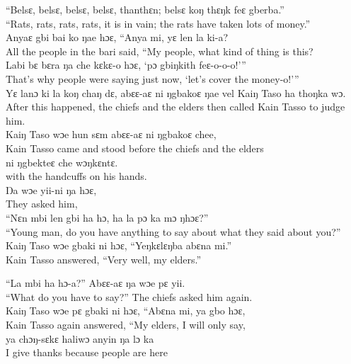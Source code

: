 “Belsɛ, belsɛ, belsɛ, belsɛ, thanthɛn; belsɛ koŋ thɛŋk feɛ gberba.”\\
“Rats, rats, rats, rats, it is in vain; the rats have taken lots of money.”\\

Anyaɛ gbi bai ko ŋae hɔɛ, “Anya mi, yɛ len la ki-a?\\
All the people in the bari said, “My people, what kind of thing is this?\\

Labi bɛ bɛra ŋa che kɛkɛ-o hɔɛ, ‘pɔ gbiŋkith feɛ-o-o-o!'”\\
That’s why people were saying just now, ‘let's cover the money-o!'”\\

Yɛ lanɔ ki la koŋ chaŋ dɛ, abɛɛ-aɛ ni ŋgbakoɛ ŋae vel Kaiŋ Taso ha thoŋka wɔ.\\
After this happened, the chiefs and the elders then called Kain Tasso to judge him.\\

Kaiŋ Taso wɔe hun sɛm abɛɛ-aɛ ni ŋgbakoɛ chee,\\ 
Kain Tasso came and stood before the chiefs and the elders\\ 

ni ŋgbekteɛ che wɔŋkɛntɛ.\\
with the handcuffs on his hands.\\

Ŋa wɔe yii-ni ŋa hɔɛ,\\ 
They asked him,\\ 

“Nɛn mbi len gbi ha hɔ, ha la pɔ ka mɔ ŋhɔɛ?”\\
“Young man, do you have anything to say about what they said about you?”\\

Kaiŋ Taso wɔe gbaki ni hɔɛ, “Yeŋkɛlɛŋba abɛna mi.”\\
Kain Tasso answered, “Very well, my elders.”\newpage

“La mbi ha hɔ-a?” Abɛɛ-aɛ ŋa wɔe pɛ yii.\\
“What do you have to say?” The chiefs asked him again.\\

Kaiŋ Taso wɔe pɛ gbaki ni hɔɛ, “Abɛna mi, ya gbo hɔɛ,\\
Kain Tasso again answered, “My elders, I will only say,\\

ya chɔŋ-sɛkɛ haliwɔ anyin ŋa lɔ ka\\ 
I give thanks because people are here\\ 

